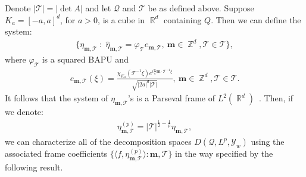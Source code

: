 \documentclass[11pt,a4paper]{article}
\numberwithin{equation}{section}
\def\<{\langle}
\def\>{\rangle}
\DeclareMathOperator{\R}{\mathbb{R}}
\DeclareMathOperator{\Z}{\mathbb{Z}}
\newcommand{\bapu}{\varphi} %
\newcommand{\mcQ}{\mathcal{Q}}  %
\newcommand{\mcT}{\mathcal{T}}  %
\newcommand{\mcY}{\mathcal{Y}}
\newcommand{\msT}{\mathscr{T}} %
\renewcommand{\vec}[1]{\boldsymbol{#1}} %
\begin{document}
Denote $|\msT| = |\det A|$ and let $\mcQ$ and $\mcT$ be as defined above. Suppose $K_a = [-a, a]^d$, for $a>0$, is a cube in $\R^d$ containing $Q$. Then we can define the system: 
\begin{align*}
    \lbrace 
    \eta_{\vec{m},\msT} \; : \;
    \widehat{\eta}_{\vec{m},\msT} =  \bapu_\msT e_{\vec{m},\msT},  \ \vec{m} \in \Z^d, \msT \in \mcT \rbrace,
\end{align*}
where $\bapu_\msT$ is a squared BAPU and
\begin{align*}
    e_{\vec{m},\msT}(\xi) = \frac{\chi_{K_a} (\msT^{-1} \xi) e^{i \frac{\pi}{a} \vec{m} \cdot \msT^{-1}\xi}}{\sqrt{|2a|^d |\msT|}}, \ \vec{m} \in \Z^d, \msT \in \mcT.
\end{align*}
It follows that the system of $\eta_{\vec{m},\msT}$'s is a Parseval frame of $L^2(\R^d)$~\cite{borup2007frame}. Then, if we denote:
\begin{align*}
    \eta_{\vec{m},\msT}^{(p)} = |\msT|^{\frac{1}{2} - \frac{1}{p}} \eta_{\vec{m},\msT},
\end{align*}
we can characterize all of the decomposition spaces $D(\mcQ, L^p, \mcY_w)$ using the associated frame coefficients $\lbrace \< f, \eta_{\vec{m},\msT}^{(p)} \> : \vec{m}, \msT \rbrace$ in the way specified by the following result.
\end{document}
